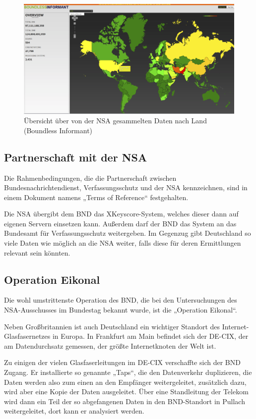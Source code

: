 \documentclass[12pt,a4paper]{scrartcl}
\begin{document}
\begin{figure}[H]
\centering
\includegraphics[width=\textwidth]{images/bi.png}
\caption{Übersicht über von der NSA gesammelten Daten nach Land (Boundless Informant)\cite{nsa_bi}}
\label{fig:boundless_informant}
\end{figure}

\subsection{Partnerschaft mit der NSA}
Die Rahmenbedingungen, die die Partnerschaft zwischen Bundesnachrichtendienst, Verfassungsschutz und der NSA kennzeichnen, sind in einem Dokument namens „Terms of Reference“ festgehalten.\cite{zeit_tor}

Die NSA übergibt dem BND das XKeyscore-System, welches dieser dann auf eigenen Servern einsetzen kann. Außerdem darf der BND das System an das Bundesamt für Verfassungsschutz weitergeben. Im Gegenzug gibt Deutschland so viele Daten wie möglich an die NSA weiter, falls diese für deren Ermittlungen relevant sein könnten.\cite{zeit_tor}

\subsection{Operation Eikonal}
Die wohl umstrittenste Operation des BND, die bei den Untersuchungen des NSA-Ausschusses im Bundestag bekannt wurde, ist die „Operation Eikonal“. \cite{zeit_eikonal}

Neben Großbritannien ist auch Deutschland ein wichtiger Standort des Internet-Glasfasernetzes in Europa. In Frankfurt am Main befindet sich der DE-CIX, der am Datendurchsatz gemessen, der größte Internetknoten der Welt ist.\cite{decix_facts}

Zu einigen der vielen Glasfaserleitungen im DE-CIX verschaffte sich der BND Zugang. Er installierte so genannte „Taps“, die den Datenverkehr duplizieren, die Daten werden also zum einen an den Empfänger weitergeleitet, zusätzlich dazu, wird aber eine Kopie der Daten ausgeleitet.\cite{wiki_eikonal} Über eine Standleitung der Telekom wird dann ein Teil der so abgefangenen Daten in den BND-Standort in Pullach weitergeleitet, dort kann er analysiert werden.\cite{zeit_eikonal}
\end{document}
